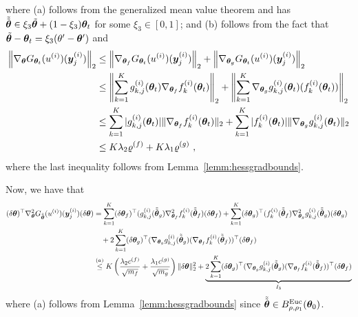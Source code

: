 where (a) follows from the generalized mean value theorem and has $\tilde{\tilde{{\bm{\theta}}}}\in\xi_3 \tilde{{\bm{\theta}}}+(1-\xi_3){\bm{\theta}}_t$ for some $\xi_3\in[0,1]$; and (b) follows from the fact that $\tilde{{\bm{\theta}}}-{\bm{\theta}}_t=\xi_3(\theta'-{\bm{\theta}}')$ and 
\begin{align*}
\left\| \nabla_{{\bm{\theta}}} G_{{\bm{\theta}}_t}(u^{(i)})({\bm{y}}^{(i)}_j) \right\|_2 &\leq 
\left\| \nabla_{{\bm{\theta}}_f} G_{{\bm{\theta}}_t}(u^{(i)})({\bm{y}}^{(i)}_j) \right\|_2 +
\left\| \nabla_{{\bm{\theta}}_g} G_{{\bm{\theta}}_t}(u^{(i)})({\bm{y}}^{(i)}_j) \right\|_2\\
&\leq 
\left\| \sum_{k=1}^K g^{(i)}_{k,j}({\bm{\theta}}_t)\nabla_{{\bm{\theta}}_f}f^{(i)}_k({\bm{\theta}}_t)\right\|_2
+
\left\| \sum_{k=1}^K \nabla_{{\bm{\theta}}_g}g^{(i)}_{k,j}({\bm{\theta}}_t)(f^{(i)}_k({\bm{\theta}}_t))\right\|_2\\
&\leq 
\sum_{k=1}^K|g^{(i)}_{k,j}({\bm{\theta}}_t)|\lVert\nabla_{{\bm{\theta}}_f}f^{(i)}_k({\bm{\theta}}_t)\rVert_2 + 
\sum_{k=1}^K|f^{(i)}_{k}({\bm{\theta}}_t)|\lVert\nabla_{{\bm{\theta}}_g}g^{(i)}_{k,j}({\bm{\theta}}_t)\rVert_2\\
&\leq K\lambda_2\varrho^{(f)}+K\lambda_1\varrho^{(g)}~, 
\end{align*}
where the last inequality follows from Lemma~\ref{lemm:hessgradbounds}.

Now, we have that
\begin{equation}
\label{eq:dd_G}
\begin{aligned}
    (\delta {\bm{\theta}})^\top \nabla_{{\bm{\theta}}}^2 G_{\tilde{\tilde{{\bm{\theta}}}}}(u^{(i)})({\bm{y}}^{(i)}_j)(\delta{\bm{\theta}}) &= 
\sum^K_{k=1}(\delta{\bm{\theta}}_f)^\top(g^{(i)}_{k,j}(\tilde{\tilde{{\bm{\theta}}}}_g)\nabla^2_{{\bm{\theta}}_f}f^{(i)}_{k}(\tilde{\tilde{{\bm{\theta}}}}_f)(\delta{\bm{\theta}}_f)
+ 
\sum^K_{k=1}(\delta{\bm{\theta}}_g)^\top(f^{(i)}_{k}(\tilde{\tilde{{\bm{\theta}}}}_f)\nabla^2_{{\bm{\theta}}_g}g^{(i)}_{k,j}(\tilde{\tilde{{\bm{\theta}}}}_g)(\delta{\bm{\theta}}_g)\\
&\quad 
+2\sum^K_{k=1}(\delta{\bm{\theta}}_g)^\top(\nabla_{{\bm{\theta}}_g}g^{(i)}_{k,j}(\tilde{\tilde{{\bm{\theta}}}}_g)(\nabla_{{\bm{\theta}}_f}f^{(i)}_{k}(\tilde{\tilde{{\bm{\theta}}}}_f))^\top(\delta{\bm{\theta}}_f)\\
&\overset{(a)}{\leq} 
K\left(\frac{\lambda_2c^{(f)}}{\sqrt{m_f}}+ \frac{\lambda_1c^{(g)}}{\sqrt{m_g}}\right)\lVert\delta{\bm{\theta}}\rVert_2^2+\underbrace{2\sum^K_{k=1}(\delta{\bm{\theta}}_g)^\top(\nabla_{{\bm{\theta}}_g}g^{(i)}_{k,j}(\tilde{\tilde{{\bm{\theta}}}}_g)(\nabla_{{\bm{\theta}}_f}f^{(i)}_{k}(\tilde{\tilde{{\bm{\theta}}}}_f))^\top(\delta{\bm{\theta}}_f)}_{I_3}
\end{aligned}
\end{equation}
where (a) follows from Lemma~\ref{lemm:hessgradbounds} since $\tilde{\tilde{{\bm{\theta}}}}\in B^{\mathrm{Euc}}_{\rho,\rho_1}({\bm{\theta}}_0)$.

